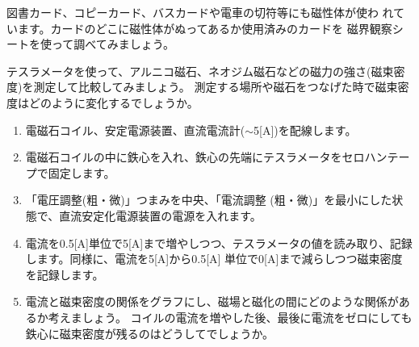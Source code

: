 


図書カード、コピーカード、バスカードや電車の切符等にも磁性体が使わ
れています。カードのどこに磁性体がぬってあるか使用済みのカードを
磁界観察シートを使って調べてみましょう。 

\bigskip



テスラメータを使って、アルニコ磁石、ネオジム磁石などの磁力の強さ(磁束密度)を測定して比較してみましょう。
測定する場所や磁石をつなげた時で磁束密度はどのように変化するでしょうか。

\newpage


\begin{enumerate}

\item 電磁石コイル、安定電源装置、直流電流計($\sim$5[A])を配線します。

\item 電磁石コイルの中に鉄心を入れ、鉄心の先端にテスラメータをセロハンテープで固定します。

\item 「電圧調整(粗・微)」つまみを中央、「電流調整 (粗・微)」を最小にした状態で、直流安定化電源装置の電源を入れます。

\item 電流を0.5[A]単位で5[A]まで増やしつつ、テスラメータの値を読み取り、記録します。同様に、電流を5[A]から0.5[A]
単位で0[A]まで減らしつつ磁束密度を記録します。

\item 電流と磁束密度の関係をグラフにし、磁場と磁化の間にどのような関係があるか考えましょう。
コイルの電流を増やした後、最後に電流をゼロにしても鉄心に磁束密度が残るのはどうしてでしょうか。

\end{enumerate}



